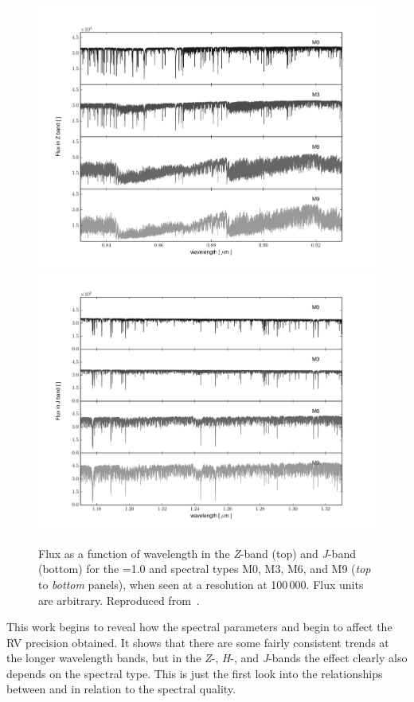 \begin{figure}
    \centering
    \includegraphics[width=0.78\linewidth]{figures/information-content/figueria_2016_figures/Zband}\\
    \includegraphics[width=0.78\linewidth]{figures/information-content/figueria_2016_figures/Jband}
    \caption[Spectral fluxes in the \emph{Z}-band and \emph{J}-band.]{Flux as a function of wavelength in the \emph{Z}-band (top) and \emph{J}-band (bottom) for the \Vsini{}=1.0\kmps{} and spectral types {M0}, {M3}, {M6}, and {M9} (\textit{top} to \textit{bottom} panels), when seen at a resolution at 100\,000.
        Flux units are arbitrary.
        Reproduced from~\citet{figueira_radial_2016}.}
    \label{fig:z_and_j_spectra}
\end{figure}

This work begins to reveal how the spectral parameters \Logg{} and \feh{} begin to affect the {RV} precision obtained.
It shows that there are some fairly consistent trends at the longer wavelength bands, but in the \emph{Z}-, \emph{H}-, and \emph{J}-bands the effect clearly also depends on the spectral type.
This is just the first look into the relationships between \feh{} and \Logg{} in relation to the spectral quality.

